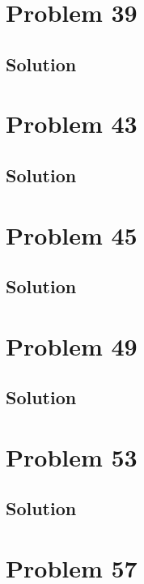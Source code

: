 \documentclass[12pt]{article}
\begin{document}
    \pagebreak
    \section{Problem 39}

        \subsection{Solution}

    \pagebreak
    \section{Problem 43}

        \subsection{Solution}

    \pagebreak
    \section{Problem 45}

        \subsection{Solution}

    \pagebreak
    \section{Problem 49}

        \subsection{Solution}

    \pagebreak
    \section{Problem 53}

        \subsection{Solution}

    \pagebreak
    \section{Problem 57}
\end{document}
